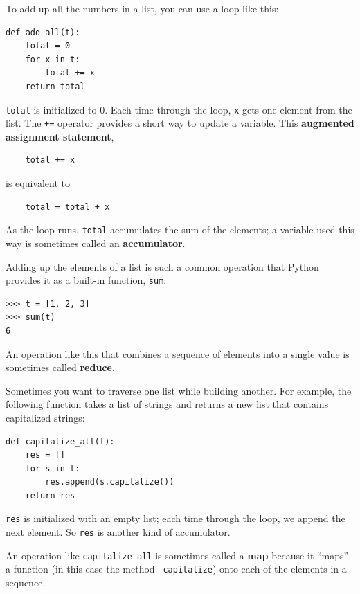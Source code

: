 \documentclass[10pt]{book}
\begin{document}
To add up all the numbers in a list, you can use a loop like this:


\begin{verbatim}
def add_all(t):
    total = 0
    for x in t:
        total += x
    return total
\end{verbatim}
%
{\tt total} is initialized to 0.  Each time through the loop,
{\tt x} gets one element from the list.  The {\tt +=} operator
provides a short way to update a variable.  This
{\bf augmented assignment statement},

\begin{verbatim}
    total += x
\end{verbatim}
%
is equivalent to

\begin{verbatim}
    total = total + x
\end{verbatim}
%
As the loop runs, {\tt total} accumulates the sum of the
elements; a variable used this way is sometimes called an
{\bf accumulator}.

Adding up the elements of a list is such a common operation
that Python provides it as a built-in function, {\tt sum}:

\begin{verbatim}
>>> t = [1, 2, 3]
>>> sum(t)
6
\end{verbatim}
%
An operation like this that combines a sequence of elements into
a single value is sometimes called {\bf reduce}.

Sometimes you want to traverse one list while building
another.  For example, the following function takes a list of strings
and returns a new list that contains capitalized strings:

\begin{verbatim}
def capitalize_all(t):
    res = []
    for s in t:
        res.append(s.capitalize())
    return res
\end{verbatim}
%
{\tt res} is initialized with an empty list; each time through
the loop, we append the next element.  So {\tt res} is another
kind of accumulator.

An operation like \verb"capitalize_all" is sometimes called a {\bf
map} because it ``maps'' a function (in this case the method {\tt
capitalize}) onto each of the elements in a sequence.
\end{document}
